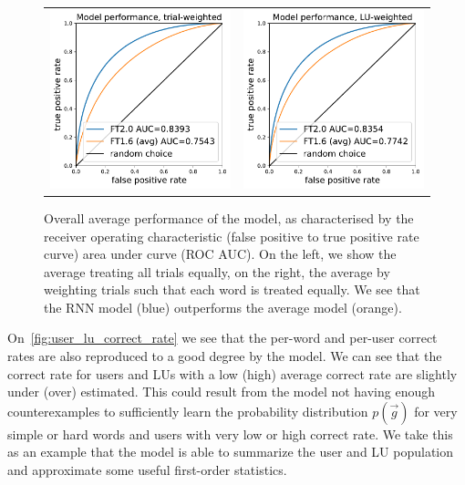 \begin{figure}[ht]
\centering
\begin{tabular}{cc}
\includegraphics[width=0.4\linewidth]{figures/lingvist/roc_trial.pdf} &
\includegraphics[width=0.4\linewidth]{figures/lingvist/roc_lu.pdf} \\
\end{tabular}
\caption{Overall average performance of the model, as characterised by the receiver operating characteristic (false positive to true positive rate curve) area under curve (ROC AUC). On the left, we show the average treating all trials equally, on the right, the average by weighting trials such that each word is treated equally. We see that the RNN model (blue) outperforms the average model (orange).} 
\label{fig:roc} 
\end{figure} 

On~\cref{fig:user_lu_correct_rate} we see that the per-word and per-user correct rates are also reproduced to a good degree by the model. We can see that the correct rate for users and LUs with a low (high) average correct rate are slightly under (over) estimated. This could result from the model not having enough counterexamples to sufficiently learn the probability distribution $p(\vec{g})$ for very simple or hard words and users with very low or high correct rate. We take this as an example that the model is able to summarize the user and LU population and approximate some useful first-order statistics.

